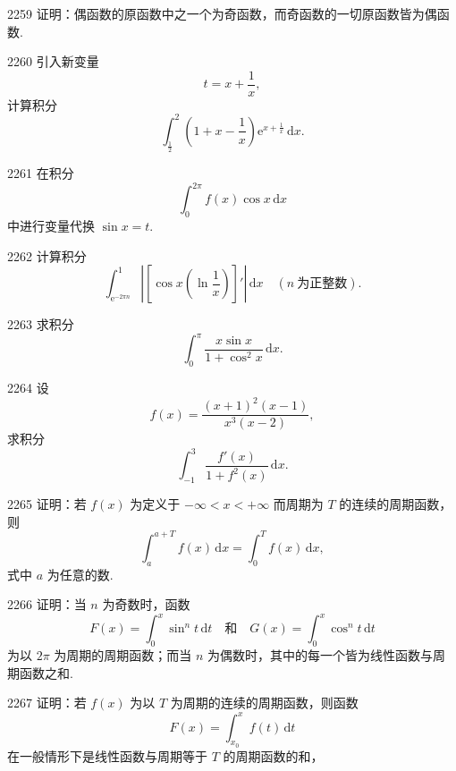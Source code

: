 \begin{prob}[M]{2259}
证明：偶函数的原函数中之一个为奇函数，而奇函数的一切原函数皆为偶函数.
\end{prob}

\begin{prob}[M]{2260}
引入新变量
\[ t = x + \frac{1}{x}, \]
计算积分
\[ \int_{\frac{1}{2}}^2 \left(1 + x - \frac{1}{x}\right)\mathrm{e}^{x+\frac{1}{x}}\,\mathrm{d}x. \]
\end{prob}

\begin{prob}[M]{2261}
在积分
\[ \int_0^{2\pi} f(x)\cos x\,\mathrm{d}x \]
中进行变量代换 $\sin x = t$.
\end{prob}

\begin{prob}[M]{2262}
计算积分
\[ \int_{\mathrm{e}^{-2\pi n}}^1 \left| \left[ \cos x \left( \ln \frac{1}{x} \right) \right]' \right| \,\mathrm{d}x \quad (n\ \text{为正整数}). \]
\end{prob}

\begin{prob}[M]{2263}
求积分
\[ \int_0^\pi \frac{x\sin x}{1+\cos^2 x}\,\mathrm{d}x. \]
\end{prob}

\begin{prob}[M]{2264}
设
\[ f(x) = \frac{(x+1)^2(x-1)}{x^3(x-2)}, \]
求积分
\[ \int_{-1}^3 \frac{f'(x)}{1+f^2(x)}\,\mathrm{d}x. \]
\end{prob}

\begin{prob}[M]{2265}
证明：若 $f(x)$ 为定义于 $-\infty < x < +\infty$ 而周期为 $T$ 的连续的周期函数，则
\[ \int_a^{a+T} f(x)\,\mathrm{d}x = \int_0^T f(x)\,\mathrm{d}x, \]
式中 $a$ 为任意的数.
\end{prob}

\begin{prob}[M]{2266}
证明：当 $n$ 为奇数时，函数
\[ F(x) = \int_0^x \sin^n t\,\mathrm{d}t \quad \text{和} \quad G(x) = \int_0^x \cos^n t\,\mathrm{d}t \]
为以 $2\pi$ 为周期的周期函数；而当 $n$ 为偶数时，其中的每一个皆为线性函数与周期函数之和.
\end{prob}

\begin{prob}[M]{2267}
证明：若 $f(x)$ 为以 $T$ 为周期的连续的周期函数，则函数
\[ F(x) = \int_{x_0}^x f(t)\,\mathrm{d}t \]
在一般情形下是线性函数与周期等于 $T$ 的周期函数的和，
\end{prob}


